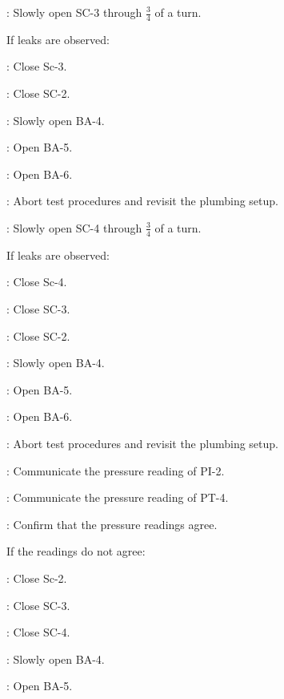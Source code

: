 \begin{checklist}
    \item \primary{}: Slowly open SC-3 through $\frac{3}{4}$ of a turn.
    \item If leaks are observed:
    \begin{checklist}
            \item \primary{}: Close Sc-3.
            \item \primary{}: Close SC-2.
            \item \primary{}: Slowly open BA-4.
            \item \primary{}: Open BA-5. 
            \item \primary{}: Open BA-6. 
            \item \ops{}: Abort test procedures and revisit the plumbing setup. 
    \end{checklist}
    \item \primary{}: Slowly open SC-4 through $\frac{3}{4}$ of a turn.
    \item If leaks are observed:
    \begin{checklist}
            \item \primary{}: Close Sc-4.
            \item \primary{}: Close SC-3.
            \item \primary{}: Close SC-2. 
            \item \primary{}: Slowly open BA-4.
            \item \primary{}: Open BA-5. 
            \item \primary{}: Open BA-6. 
            \item \ops{}: Abort test procedures and revisit the plumbing setup. 
    \end{checklist}
    \item \primary{}: Communicate the pressure reading of PI-2.
    \item \daq{}: Communicate the pressure reading of PT-4.
    \item \ops{}: Confirm that the pressure readings agree. 
    \item If the readings do not agree:
    \begin{checklist}
            \item \primary{}: Close Sc-2.
            \item \primary{}: Close SC-3.
            \item \primary{}: Close SC-4. 
            \item \primary{}: Slowly open BA-4.
            \item \primary{}: Open BA-5. 

\end{checklist}
\end{checklist}
